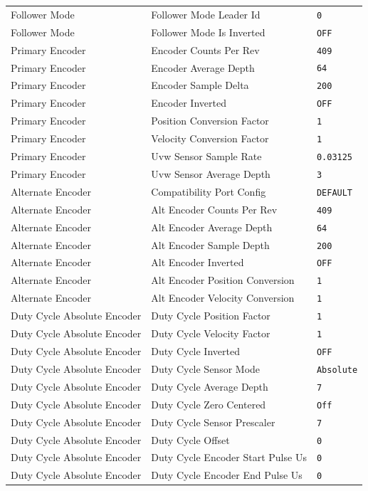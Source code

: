 \begin{longtable}{p{3.5cm} p{8cm} p{3cm}}
Follower Mode & Follower Mode Leader Id & \texttt{0} \\
Follower Mode & Follower Mode Is Inverted & \texttt{OFF} \\

Primary Encoder & Encoder Counts Per Rev & \texttt{409} \\
Primary Encoder & Encoder Average Depth & \texttt{64} \\
Primary Encoder & Encoder Sample Delta & \texttt{200} \\
Primary Encoder & Encoder Inverted & \texttt{OFF} \\
Primary Encoder & Position Conversion Factor & \texttt{1} \\
Primary Encoder & Velocity Conversion Factor & \texttt{1} \\
Primary Encoder & Uvw Sensor Sample Rate & \texttt{0.03125} \\
Primary Encoder & Uvw Sensor Average Depth & \texttt{3} \\

Alternate Encoder & Compatibility Port Config & \texttt{DEFAULT} \\
Alternate Encoder & Alt Encoder Counts Per Rev & \texttt{409} \\
Alternate Encoder & Alt Encoder Average Depth & \texttt{64} \\
Alternate Encoder & Alt Encoder Sample Depth & \texttt{200} \\
Alternate Encoder & Alt Encoder Inverted & \texttt{OFF} \\
Alternate Encoder & Alt Encoder Position Conversion & \texttt{1} \\
Alternate Encoder & Alt Encoder Velocity Conversion & \texttt{1} \\

Duty Cycle Absolute Encoder & Duty Cycle Position Factor & \texttt{1} \\
Duty Cycle Absolute Encoder & Duty Cycle Velocity Factor & \texttt{1} \\
Duty Cycle Absolute Encoder & Duty Cycle Inverted & \texttt{OFF} \\
Duty Cycle Absolute Encoder & Duty Cycle Sensor Mode & \texttt{Absolute} \\
Duty Cycle Absolute Encoder & Duty Cycle Average Depth & \texttt{7} \\
Duty Cycle Absolute Encoder & Duty Cycle Zero Centered & \texttt{Off} \\
Duty Cycle Absolute Encoder & Duty Cycle Sensor Prescaler & \texttt{7} \\
Duty Cycle Absolute Encoder & Duty Cycle Offset & \texttt{0} \\
Duty Cycle Absolute Encoder & Duty Cycle Encoder Start Pulse Us & \texttt{0} \\
Duty Cycle Absolute Encoder & Duty Cycle Encoder End Pulse Us & \texttt{0} \\


\end{longtable}
